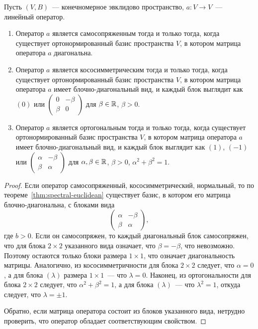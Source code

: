 \begin{theorem}\label{thm:euclidean_canonical_forms}
Пусть $(V,B)$~--- конечномерное эвклидово пространство,
$a\colon V\to V$~--- линейный оператор.
\begin{enumerate}
\item Оператор $a$ является самосопряженным тогда и
только тогда, когда существует ортонормированный базис пространства
$V$, в котором матрица оператора $a$ диагональна.
\item Оператор $a$ является кососимметрическим тогда и
только тогда, когда существует ортонормированный базис пространства
$V$, в котором матрица оператора $a$ имеет блочно-диагональный
вид, и каждый блок выглядит как $(0)$ или  $\begin{pmatrix} 0 & -\beta
  \\ \beta & 0\end{pmatrix}$ для $\beta\in\mathbb R$, $\beta > 0$.
\item Оператор $a$ является ортогональным тогда и
только тогда, когда существует ортонормированный базис пространства
$V$, в котором матрица оператора $a$ имеет блочно-диагональный
вид, и каждый блок выглядит как $(1)$, $(-1)$
или $\begin{pmatrix}\alpha&-\beta\\ \beta & \alpha\end{pmatrix}$ для
$\alpha,\beta\in\mathbb R$, $\beta > 0$, $\alpha^2 + \beta^2 = 1$.
\end{enumerate}
\end{theorem}
\begin{proof}
Если оператор самосопряженный, кососимметрический, нормальный, то по
теореме~\ref{thm:spectral-euclidean} существует базис, в котором его
матрица блочно-диагональна, с блоками вида
$$
\begin{pmatrix}
\alpha & -\beta\\
\beta & \alpha
\end{pmatrix},
$$
где $b>0$.
Если он самосопряжен, то каждый диагональный блок самосопряжен, что
для блока $2\times 2$ указанного вида означает, что $\beta=-\beta$,
что невозможно. Поэтому остаются только блоки размера $1\times 1$,
что означает диагональность матрицы. Аналогично, из кососимметричности
для блока $2\times 2$ следует, что $\alpha=0$, а для блока $(\lambda)$
размера $1\times 1$~--- что $\lambda = 0$. Наконец, из ортогональности
для блока $2\times 2$ следует, что $\alpha^2+\beta^2=1$, а для блока
$(\lambda)$~--- что $\lambda^2=1$, откуда следует, что $\lambda=\pm 1$.

Обратно, если матрица оператора состоит из блоков указанного вида,
нетрудно проверить, что оператор обладает соответствующим свойством.
\end{proof}

